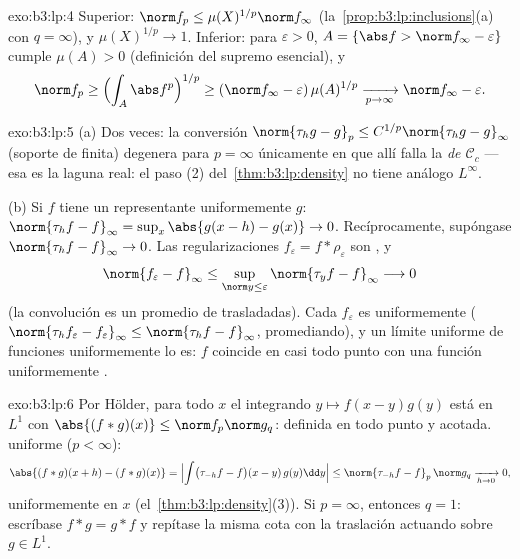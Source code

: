 \begin{solution}{exo:b3:lp:4}
Superior: $\norm f_p \leq \mu(X)^{1/p}\norm f_\infty$
(la~\cref{prop:b3:lp:inclusions}(a) con $q = \infty$), y
$\mu(X)^{1/p} \to 1$. Inferior: para $\varepsilon > 0$, $A =
\{\abs f > \norm f_\infty - \varepsilon\}$ cumple $\mu(A) > 0$
(definición del supremo esencial), y
\[
\norm f_p \geq \Bigl(\int_A \abs f^p\Bigr)^{1/p}
\geq (\norm f_\infty - \varepsilon)\,\mu(A)^{1/p}
\xrightarrow[p\to\infty]{} \norm f_\infty - \varepsilon .
\]
\end{solution}

\begin{solution}{exo:b3:lp:5}
(a) Dos veces: la conversión $\norm{\tau_hg - g}_p \leq
C^{1/p}\norm{\tau_hg - g}_\infty$ (soporte de
 finita) degenera para
$p = \infty$ únicamente en que allí falla la
\emph{ de $\mathcal C_c$} --- esa
es la laguna real: el paso (2) del~\cref{thm:b3:lp:density} no tiene
análogo $L^\infty$.

(b) Si $f$ tiene un representante uniformemente
 $g$:
$\norm{\tau_hf - f}_\infty = \sup_x\abs{g(x - h) - g(x)} \to
0$. Recíprocamente, supóngase $\norm{\tau_hf - f}_\infty \to 0$. Las
regularizaciones $f_\varepsilon = f * \rho_\varepsilon$ son
, y
\[
\norm{f_\varepsilon - f}_\infty
\leq \sup_{\norm y \leq \varepsilon}\norm{\tau_yf -
f}_\infty \longrightarrow 0
\]
(la convolución es un promedio de trasladadas). Cada $f_\varepsilon$ es
uniformemente 
($\norm{\tau_hf_\varepsilon - f_\varepsilon}_\infty \leq
\norm{\tau_hf - f}_\infty$, promediando), y un límite uniforme de
funciones uniformemente 
lo es: $f$ coincide en casi todo punto con una función uniformemente
.
\end{solution}

\begin{solution}{exo:b3:lp:6}
Por Hölder, para todo $x$ el integrando $y \mapsto f(x -
y)g(y)$ está en $L^1$ con $\abs{(f*g)(x)} \leq \norm f_p\norm
g_q$: definida en todo punto y acotada.
 uniforme ($p <
\infty$):
\[
\abs{(f*g)(x + h) - (f*g)(x)}
= \Bigl|\int\bigl(\tau_{-h}f - f\bigr)(x - y)\,g(y)\dd y\Bigr|
\leq \norm{\tau_{-h}f - f}_p\,\norm g_q
\xrightarrow[h\to0]{} 0,
\]
uniformemente en $x$ (el~\cref{thm:b3:lp:density}(3)). Si $p =
\infty$, entonces $q = 1$: escríbase $f * g = g * f$ y repítase la misma
cota con la traslación actuando sobre $g \in L^1$.
\end{solution}

